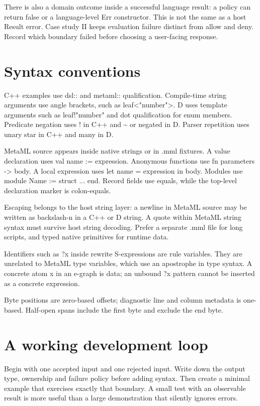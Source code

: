 There is also a domain outcome inside a successful language result: a policy can return false or a language-level Err constructor. This is not the same as a host Result error. Case study II keeps evaluation failure distinct from allow and deny. Record which boundary failed before choosing a user-facing response.

\clearpage
\section*{Syntax conventions}
C++ examples use dsl:: and metaml:: qualification. Compile-time string arguments use angle brackets, such as leaf<"number">. D uses template arguments such as leaf!"number" and dot qualification for enum members. Predicate negation uses ! in C++ and \textasciitilde{} or negated in D. Parser repetition uses unary star in C++ and many in D.

MetaML source appears inside native strings or in .mml fixtures. A value declaration uses val name := expression. Anonymous functions use fn parameters -> body. A local expression uses let name = expression in body. Modules use module Name := struct ... end. Record fields use equals, while the top-level declaration marker is colon-equals.

Escaping belongs to the host string layer: a newline in MetaML source may be written as backslash-n in a C++ or D string. A quote within MetaML string syntax must survive host string decoding. Prefer a separate .mml file for long scripts, and typed native primitives for runtime data.

Identifiers such as ?x inside rewrite S-expressions are rule variables. They are unrelated to MetaML type variables, which use an apostrophe in type syntax. A concrete atom x in an e-graph is data; an unbound ?x pattern cannot be inserted as a concrete expression.

Byte positions are zero-based offsets; diagnostic line and column metadata is one-based. Half-open spans include the first byte and exclude the end byte.

\clearpage
\section*{A working development loop}
Begin with one accepted input and one rejected input. Write down the output type, ownership and failure policy before adding syntax. Then create a minimal example that exercises exactly that boundary. A small test with an observable result is more useful than a large demonstration that silently ignores errors.

